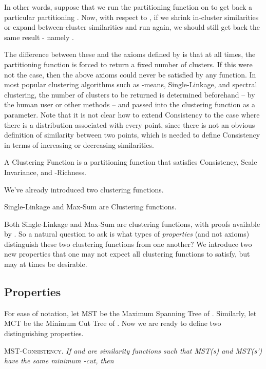 \documentclass[twoside,11pt]{article}
\begin{document}
In other words, suppose that we run the partitioning function  on  to get back a particular partitioning . Now, with respect to , if we shrink in-cluster similarities or expand between-cluster similarities and run  again, we should still get back the same result - namely .

The difference between these and the axioms defined by \cite{klein1} is that at all times, the partitioning function  is forced to return a fixed number of clusters. If this were not the case, then the above axioms could never be satisfied by any function. In most popular clustering algorithms such as -means, Single-Linkage,  and spectral clustering, the number of clusters to be returned is determined beforehand -- by the human user or other methods -- and passed into the clustering function as a parameter. Note that it is not clear how to extend Consistency to the case where there is a distribution associated with every point, since there
is not an obvious definition of similarity between two points, which is needed to define Consistency in terms of
increasing or decreasing similarities.

\begin{definition}
A Clustering Function is a partitioning function that satisfies Consistency, Scale Invariance, and -Richness.
\end{definition}

We've already introduced two clustering functions.

\begin{theorem}
Single-Linkage and Max-Sum are Clustering functions.
\end{theorem}

Both Single-Linkage and Max-Sum are clustering functions, with proofs available by \cite{bosagh2009}. So a natural question to ask is what types of \textit{properties} (and not axioms) distinguish these two clustering functions from one another? We introduce two new properties that one may not expect all clustering functions to satisfy, but may at times be desirable.

\subsection{Properties}

For ease of notation, let MST be the Maximum Spanning Tree of . Similarly, let MCT be the Minimum Cut Tree of . Now we are ready to define two distinguishing properties.

\begin{center}
\textsc{MST-Consistency.} \textit{If  and  are similarity functions such that MST(s) and MST(s') have the same minimum -cut, then }
\end{center}
\end{document}
